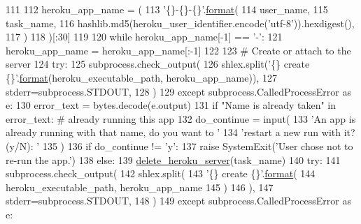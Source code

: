 \begin{DoxyCode}
111 
112     heroku\_app\_name = (
113         \textcolor{stringliteral}{'\{\}-\{\}-\{\}'}.\hyperlink{namespaceparlai_1_1chat__service_1_1services_1_1messenger_1_1shared__utils_a32e2e2022b824fbaf80c747160b52a76}{format}(
114             user\_name,
115             task\_name,
116             hashlib.md5(heroku\_user\_identifier.encode(\textcolor{stringliteral}{'utf-8'})).hexdigest(),
117         )
118     )[:30]
119 
120     \textcolor{keywordflow}{while} heroku\_app\_name[-1] == \textcolor{stringliteral}{'-'}:
121         heroku\_app\_name = heroku\_app\_name[:-1]
122 
123     \textcolor{comment}{# Create or attach to the server}
124     \textcolor{keywordflow}{try}:
125         subprocess.check\_output(
126             shlex.split(\textcolor{stringliteral}{'\{\} create \{\}'}.\hyperlink{namespaceparlai_1_1chat__service_1_1services_1_1messenger_1_1shared__utils_a32e2e2022b824fbaf80c747160b52a76}{format}(heroku\_executable\_path, heroku\_app\_name)),
127             stderr=subprocess.STDOUT,
128         )
129     \textcolor{keywordflow}{except} subprocess.CalledProcessError \textcolor{keyword}{as} e:
130         error\_text = bytes.decode(e.output)
131         \textcolor{keywordflow}{if} \textcolor{stringliteral}{"Name is already taken"} \textcolor{keywordflow}{in} error\_text:  \textcolor{comment}{# already running this app}
132             do\_continue = input(
133                 \textcolor{stringliteral}{'An app is already running with that name, do you want to '}
134                 \textcolor{stringliteral}{'restart a new run with it? (y/N): '}
135             )
136             \textcolor{keywordflow}{if} do\_continue != \textcolor{stringliteral}{'y'}:
137                 \textcolor{keywordflow}{raise} SystemExit(\textcolor{stringliteral}{'User chose not to re-run the app.'})
138             \textcolor{keywordflow}{else}:
139                 \hyperlink{namespaceparlai_1_1mturk_1_1core_1_1server__utils_a8dfde882f9d6ff492ca565ae2334fc70}{delete\_heroku\_server}(task\_name)
140                 \textcolor{keywordflow}{try}:
141                     subprocess.check\_output(
142                         shlex.split(
143                             \textcolor{stringliteral}{'\{\} create \{\}'}.\hyperlink{namespaceparlai_1_1chat__service_1_1services_1_1messenger_1_1shared__utils_a32e2e2022b824fbaf80c747160b52a76}{format}(
144                                 heroku\_executable\_path, heroku\_app\_name
145                             )
146                         ),
147                         stderr=subprocess.STDOUT,
148                     )
149                 \textcolor{keywordflow}{except} subprocess.CalledProcessError \textcolor{keyword}{as} e:

\end{DoxyCode}
